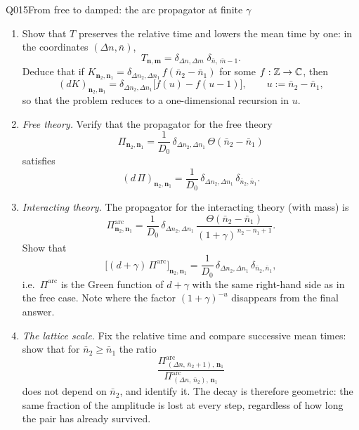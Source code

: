 \begin{entry}{Q015}{From free to damped: the arc propagator at finite $\gamma$}
\begin{problem}
\begin{enumerate}[label=\textbf{(\alph*)},leftmargin=*]
  \item Show that $T$ preserves the relative time and lowers the mean time by one:
        in the coordinates $(\Delta n,\bar n)$,
        \[
          T_{\mathbf n,\mathbf m}
          =\delta_{\Delta n,\Delta m}\;\delta_{\bar n,\,\bar m-1}.
        \]
        Deduce that if $K_{\mathbf n_2,\mathbf n_1}
        =\delta_{\Delta n_2,\Delta n_1}\,f(\bar n_2-\bar n_1)$ for some
        $f:\mathbb{Z}\to\mathbb{C}$, then
        \[
          (dK)_{\mathbf n_2,\mathbf n_1}
          =\delta_{\Delta n_2,\Delta n_1}\bigl[f(u)-f(u-1)\bigr],
          \qquad u:=\bar n_2-\bar n_1 ,
        \]
        so that the problem reduces to a one-dimensional recursion in $u$.

  \item \emph{Free theory.} Verify that the propagator for the free theory
        \[
          \Pi_{\mathbf n_2,\mathbf n_1}
          =\frac{1}{D_0}\,\delta_{\Delta n_2,\Delta n_1}\,\Theta(\bar n_2-\bar n_1)
        \]
        satisfies
        \[
          (d\,\Pi)_{\mathbf n_2,\mathbf n_1}
          =\frac{1}{D_0}\,\delta_{\Delta n_2,\Delta n_1}\,
            \delta_{\bar n_2,\bar n_1} .
        \]

  \item \emph{Interacting theory.} The propagator for the interacting theory (with mass) is
        \[
          \Pi^{\mathrm{arc}}_{\mathbf n_2,\mathbf n_1}
          =\frac{1}{D_0}\,\delta_{\Delta n_2,\Delta n_1}\,
            \frac{\Theta(\bar n_2-\bar n_1)}{(1+\gamma)^{\,\bar n_2-\bar n_1+1}} .
        \]
        Show that 
        \[
          \bigl[(d+\gamma)\,\Pi^{\mathrm{arc}}\bigr]_{\mathbf n_2,\mathbf n_1}
          =\frac{1}{D_0}\,\delta_{\Delta n_2,\Delta n_1}\,
            \delta_{\bar n_2,\bar n_1} ,
        \]
        i.e.\ $\Pi^{\mathrm{arc}}$ is the Green function of $d+\gamma$ with the same
        right-hand side as in the free case. Note where the factor
        $(1+\gamma)^{-u}$ disappears from the final answer.

   \item \emph{The lattice scale.} Fix the relative time and compare successive mean
        times: show that for $\bar n_2\ge\bar n_1$ the ratio
        \[
          \frac{\Pi^{\mathrm{arc}}_{\,(\Delta n,\,\bar n_2+1),\,\mathbf n_1}}
               {\Pi^{\mathrm{arc}}_{\,(\Delta n,\,\bar n_2),\,\mathbf n_1}}
        \]
        does not depend on $\bar n_2$, and identify it. The decay is therefore
        geometric: the same fraction of the amplitude is lost at every step, regardless
        of how long the pair has already survived.


\end{enumerate}
\end{problem}
\end{entry}
